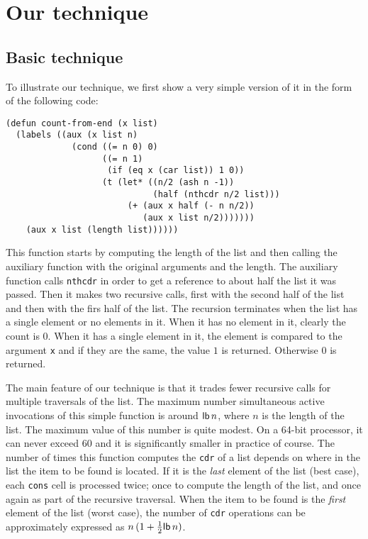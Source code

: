 \section{Our technique}

\subsection{Basic technique}
\label{sec-basic-technique}

To illustrate our technique, we first show a very simple version of it
in the form of the following code:

{\small\begin{verbatim}
(defun count-from-end (x list)
  (labels ((aux (x list n)
             (cond ((= n 0) 0)
                   ((= n 1)
                    (if (eq x (car list)) 1 0))
                   (t (let* ((n/2 (ash n -1))
                             (half (nthcdr n/2 list)))
                        (+ (aux x half (- n n/2))
                           (aux x list n/2)))))))
    (aux x list (length list))))))
\end{verbatim}}

This function starts by computing the length of the list and then
calling the auxiliary function with the original arguments and the
length.  The auxiliary function calls \texttt{nthcdr} in order to get
a reference to about half the list it was passed.  Then it makes two
recursive calls, first with the second half of the list and then with
the firs half of the list.  The recursion terminates when the list has
a single element or no elements in it.  When it has no element in it,
clearly the count is $0$.  When it has a single element in it, the
element is compared to the argument \texttt{x} and if they are the
same, the value $1$ is returned.  Otherwise $0$ is returned.

The main feature of our technique is that it trades fewer recursive
calls for multiple traversals of the list.  The maximum number%
simultaneous active invocations of this simple function is around
$\mathsf{lb}\thinspace n$, where $n$ is the length of the list.  The
maximum value of this number is quite modest.  On a 64-bit processor,
it can never exceed $60$ and it is significantly smaller in practice
of course.  The number of times this function computes the
\texttt{cdr} of a list depends on where in the list the item to be
found is located.  If it is the \emph{last} element of the list (best
case), each \texttt{cons} cell is processed twice; once to compute the
length of the list, and once again as part of the recursive traversal.
When the item to be found is the \emph{first} element of the list
(worst case), the number of \texttt{cdr} operations can be
approximately expressed as $n\thinspace (1 +
\frac{1}{2}\mathsf{lb}\thinspace n)$.

